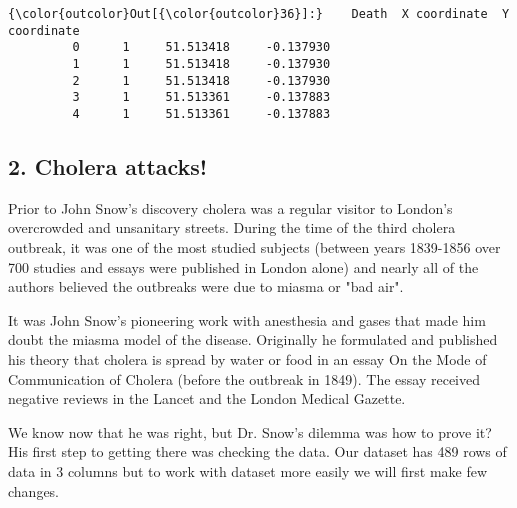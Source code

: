 \documentclass[11pt]{article}
\begin{document}
\begin{Verbatim}[commandchars=\\\{\}]
{\color{outcolor}Out[{\color{outcolor}36}]:}    Death  X coordinate  Y coordinate
         0      1     51.513418     -0.137930
         1      1     51.513418     -0.137930
         2      1     51.513418     -0.137930
         3      1     51.513361     -0.137883
         4      1     51.513361     -0.137883
\end{Verbatim}
            
    \subsection{2. Cholera attacks!}\label{cholera-attacks}

Prior to John Snow's discovery cholera was a regular visitor to London's
overcrowded and unsanitary streets. During the time of the third cholera
outbreak, it was one of the most studied subjects (between years
1839-1856 over 700 studies and essays were published in London alone)
and nearly all of the authors believed the outbreaks were due to miasma
or "bad air".

It was John Snow's pioneering work with anesthesia and gases that made
him doubt the miasma model of the disease. Originally he formulated and
published his theory that cholera is spread by water or food in an essay
On the Mode of Communication of Cholera (before the outbreak in 1849).
The essay received negative reviews in the Lancet and the London Medical
Gazette.

We know now that he was right, but Dr. Snow's dilemma was how to prove
it? His first step to getting there was checking the data. Our dataset
has 489 rows of data in 3 columns but to work with dataset more easily
we will first make few changes.
\end{document}
